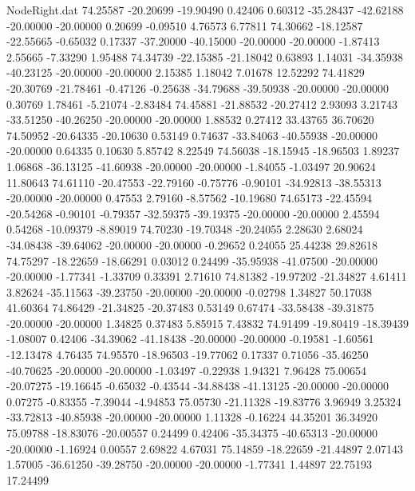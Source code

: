 \begin{filecontents}{NodeRight.dat}
  74.25587  -20.20699  -19.90490     0.42406    0.60312  -35.28437  -42.62188  -20.00000  -20.00000    0.20699   -0.09510    4.76573    6.77811
  74.30662  -18.12587  -22.55665    -0.65032    0.17337  -37.20000  -40.15000  -20.00000  -20.00000   -1.87413    2.55665   -7.33290    1.95488
  74.34739  -22.15385  -21.18042     0.63893    1.14031  -34.35938  -40.23125  -20.00000  -20.00000    2.15385    1.18042    7.01678   12.52292
  74.41829  -20.30769  -21.78461    -0.47126   -0.25638  -34.79688  -39.50938  -20.00000  -20.00000    0.30769    1.78461   -5.21074   -2.83484
  74.45881  -21.88532  -20.27412     2.93093    3.21743  -33.51250  -40.26250  -20.00000  -20.00000    1.88532    0.27412   33.43765   36.70620
  74.50952  -20.64335  -20.10630     0.53149    0.74637  -33.84063  -40.55938  -20.00000  -20.00000    0.64335    0.10630    5.85742    8.22549
  74.56038  -18.15945  -18.96503     1.89237    1.06868  -36.13125  -41.60938  -20.00000  -20.00000   -1.84055   -1.03497   20.90624   11.80643
  74.61110  -20.47553  -22.79160    -0.75776   -0.90101  -34.92813  -38.55313  -20.00000  -20.00000    0.47553    2.79160   -8.57562  -10.19680
  74.65173  -22.45594  -20.54268    -0.90101   -0.79357  -32.59375  -39.19375  -20.00000  -20.00000    2.45594    0.54268  -10.09379   -8.89019
  74.70230  -19.70348  -20.24055     2.28630    2.68024  -34.08438  -39.64062  -20.00000  -20.00000   -0.29652    0.24055   25.44238   29.82618
  74.75297  -18.22659  -18.66291     0.03012    0.24499  -35.95938  -41.07500  -20.00000  -20.00000   -1.77341   -1.33709    0.33391    2.71610
  74.81382  -19.97202  -21.34827     4.61411    3.82624  -35.11563  -39.23750  -20.00000  -20.00000   -0.02798    1.34827   50.17038   41.60364
  74.86429  -21.34825  -20.37483     0.53149    0.67474  -33.58438  -39.31875  -20.00000  -20.00000    1.34825    0.37483    5.85915    7.43832
  74.91499  -19.80419  -18.39439    -1.08007    0.42406  -34.39062  -41.18438  -20.00000  -20.00000   -0.19581   -1.60561  -12.13478    4.76435
  74.95570  -18.96503  -19.77062     0.17337    0.71056  -35.46250  -40.70625  -20.00000  -20.00000   -1.03497   -0.22938    1.94321    7.96428
  75.00654  -20.07275  -19.16645    -0.65032   -0.43544  -34.88438  -41.13125  -20.00000  -20.00000    0.07275   -0.83355   -7.39044   -4.94853
  75.05730  -21.11328  -19.83776     3.96949    3.25324  -33.72813  -40.85938  -20.00000  -20.00000    1.11328   -0.16224   44.35201   36.34920
  75.09788  -18.83076  -20.00557     0.24499    0.42406  -35.34375  -40.65313  -20.00000  -20.00000   -1.16924    0.00557    2.69822    4.67031
  75.14859  -18.22659  -21.44897     2.07143    1.57005  -36.61250  -39.28750  -20.00000  -20.00000   -1.77341    1.44897   22.75193   17.24499

\end{filecontents}
